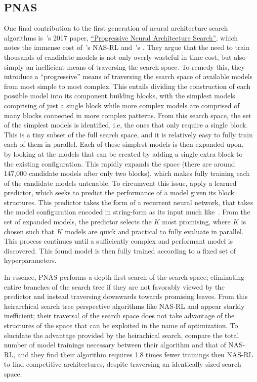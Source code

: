\subsection{PNAS}
One final contribution to the first generation of neural architecture search algorithms is~\citeauthor{liu2017}'s 2017 paper,
\hyperlink{cite.liu2017}{``Progressive Neural Architecture Search''}, which notes the immense cost of~\citeauthor{zoph2017}'s NAS-RL and~\citeauthor{real2017}'s
. They argue that the need to train thousands of candidate models is not only overly wasteful
in time cost, but also simply an inefficient means of traversing the search space. To remedy this, they introduce
a ``progressive'' means of traversing the search space of available models from most simple to most complex. This entails
dividing the construction of each possible model into its component building blocks, with the simplest models
comprising of just a single block while more complex models are comprised of many blocks connected in more complex patterns.
From this search space, the set of the simplest models is identified, i.e, the ones that only require a single block.
This is a tiny subset of the full search space, and it is relatively easy to fully train each of them in parallel.
Each of these simplest models is then expanded upon, by looking at the models that can be created by adding a single
extra block to the existing configuration. This rapidly expands the space (there are around 147,000 candidate models after
only two blocks), which makes fully training each of the candidate models untenable. To circumvent this issue,
\citeauthor{liu2017} apply a learned predictor, which seeks to predict the performance of a model given its block structures. This
predictor takes the form of a recurrent neural network, that takes the model configuration encoded in string-form as its
input much like~\cite{zoph2017}. From the set of expanded models, the predictor selects the $K$ most promising, where
$K$ is chosen such that $K$ models are quick and practical to fully evaluate in parallel. This process continues until
a sufficiently complex and performant model is discovered. This found model is then fully trained according to a fixed
set of hyperparameters.

In essence, PNAS performs a depth-first search of the search space; eliminating entire branches of the search tree if
they are not favorably viewed by the predictor and instead traversing downwards towards promising leaves. From this heirarchical
search tree perspective algorithms like NAS-RL and  appear starkly inefficient; their traversal
of the search space does not take advantage of the structures of the space that can be exploited in the name of optimization.
To elucidate the advantage provided by the heirachical search, \citeauthor{liu2017} compare the total number of model trainings
necessary between their algorithm and that of NAS-RL, and they find their algorithm requires 1.8 times fewer
trainings then NAS-RL to find competitive architectures, despite traversing an identically sized search space.

